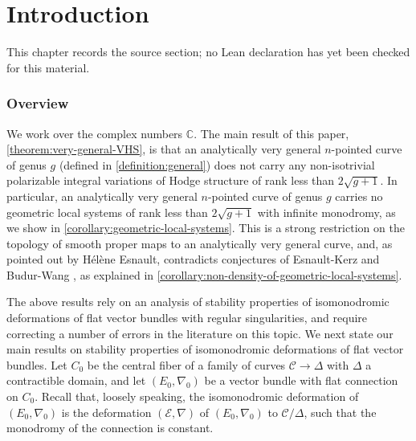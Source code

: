 \chapter{Introduction}
\label{geometric-local-systems-general-curves-isomonodromy-chapter-01}

\begin{remark}
\label{geometric-local-systems-general-curves-isomonodromy-chapter-01-source}
This chapter records the source section; no Lean declaration has yet been checked for this material.
\notready
\end{remark}

\label{section:introduction}
\subsection{Overview}
\label{subsection:overview}
We work over the complex numbers $\mathbb{C}$.
The main result of this paper, \autoref{theorem:very-general-VHS}, is that an
analytically very general $n$-pointed curve of genus $g$
(defined in \autoref{definition:general})
does not carry any
non-isotrivial polarizable integral variations of Hodge structure of rank less than $2\sqrt{g+1}$. In particular, an
analytically very general $n$-pointed curve of genus $g$ carries no geometric local
systems of rank less than $2\sqrt{g+1}$ with infinite monodromy, as we show in
\autoref{corollary:geometric-local-systems}. This is a strong restriction on the
topology of smooth proper maps to an analytically very general curve, and, as pointed out by H\'el\`ene Esnault, contradicts conjectures of Esnault-Kerz \cite[Conjecture 1.1]{esnault2021local} and Budur-Wang \cite[Conjecture 10.3.1]{budur2020absolute}, as explained in \autoref{corollary:non-density-of-geometric-local-systems}.

The above results rely on an analysis of stability properties of isomonodromic deformations of flat vector bundles with regular singularities, and require correcting a number of errors in the literature on this topic.
We next state our main results on stability properties of isomonodromic
deformations of flat vector bundles.
Let $C_0$ be the central fiber of a family of curves $\mathscr{C}\to \Delta$
with $\Delta$ a contractible domain, and let $(E_0, \nabla_0)$ be a vector
bundle with flat connection
on $C_0$. Recall that, loosely speaking, the isomonodromic deformation of $(E_0, \nabla_0)$  is the deformation $(\mathscr{E}, \nabla)$  of $(E_0, \nabla_0)$ to $\mathscr{C}/\Delta$, such that the monodromy of the connection is constant.

